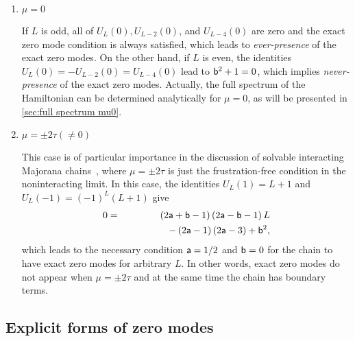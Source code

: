 \documentclass[aps, prb, showpacs, twocolumn, %
amssymb,superscriptaddress]{revtex4}
\begin{document}
\begin{enumerate}
\item $\mu=0$

If $L$ is odd, all of $U_{L} \left( 0 \right), U_{L-2} \left( 0 \right)$, and $U_{L-4} \left( 0 \right)$ are zero and the exact zero mode condition is always satisfied, which leads to \textit{ever-presence} of the exact zero modes. On the other hand, if $L$ is even, the identities $U_{L} \left( 0 \right) = -U_{L-2} \left( 0 \right) = U_{L-4} \left( 0 \right)$ lead to ${\sf b}^{2} + 1 = 0$, which implies \textit{never-presence} of the exact zero modes. Actually, the full spectrum of the Hamiltonian can be determined analytically for $\mu=0$, as will be presented in \ref{sec:full spectrum mu0}.


\item $\mu = \pm 2 \tau \left( \neq 0 \right)$

This case is of particular importance in the discussion of solvable interacting Majorana chains~\cite{Katsura_Int_Majorana}, where $\mu = \pm 2 \tau$ is just the frustration-free condition in the noninteracting limit. In this case, the identities $U_{L} \left( 1 \right) = L+1$ and $U_{L} \left( -1 \right) = \left( -1 \right)^{L} \left( L+1 \right)$ give
\begin{eqnarray}
0
&=& \left( 2 {\sf a} + {\sf b} - 1 \right) \left( 2 {\sf a} - {\sf b} - 1 \right) L \nonumber \\
&~&~~~~~~~~~~~~~ - \left( 2 {\sf a} - 1 \right) \left( 2 {\sf a} - 3 \right) + {\sf b}^{2},
\end{eqnarray}
which leads to the necessary condition ${\sf a}=1/2$ and ${\sf b}=0$ for the chain to have exact zero modes for arbitrary $L$. In other words, exact zero modes do not appear when $\mu = \pm 2 \tau$ %
and at the same time the chain has boundary terms.
\end{enumerate}

\subsection{Explicit forms of zero modes}
\label{sec:expform}
\end{document}
